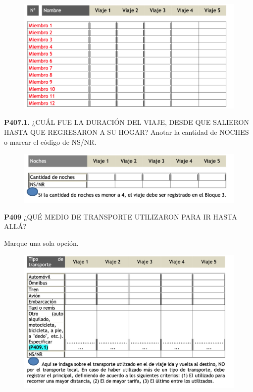 \documentclass[
  openany]{book}
\begin{document}
\begin{figure}

{\centering \includegraphics[width=1\linewidth]{imagenes/figura6-179} 

}

\end{figure}

\textbf{P407.1.} ¿CUÁL FUE LA DURACIÓN DEL VIAJE, DESDE QUE SALIERON HASTA QUE REGRESARON A SU HOGAR?
Anotar la cantidad de NOCHES o marcar el código de NS/NR.

\begin{figure}

{\centering \includegraphics[width=1\linewidth]{imagenes/figura6-180} 

}

\end{figure}

\textbf{P409} ¿QUÉ MEDIO DE TRANSPORTE UTILIZARON PARA IR HASTA ALLÁ?

Marque una sola opción.

\begin{figure}

{\centering \includegraphics[width=1\linewidth]{imagenes/figura6-181} 

}

\end{figure}
\end{document}
